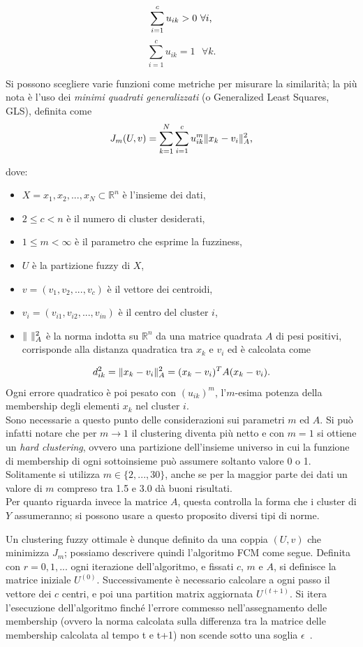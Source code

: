 \documentclass[oneside, openany]{book}
\DeclarePairedDelimiter{\norma}{\lVert}{\rVert}
\begin{document}
		\[
		\sum_{i=1}^{c}u_{ik} > 0\text{ } \forall i\text{,}\\
		\]
		\[
		\sum_{i=1}^{c}u_{ik} = 1 \text{ }\forall k\text{.}
		\]
		
		Si possono scegliere varie funzioni come metriche per misurare la similarità; la più nota è l'uso dei \textit{minimi quadrati generalizzati} (o Generalized Least Squares, GLS), definita come
		\[
			J_m(U, v)=\sum_{k=1}^{N}\sum_{i=1}^{c}u_{ik}^m\norma{x_k-v_i}^2_A\text{,}
		\]
		
		dove:
		\begin{itemize}
			\item $X = {x_1, x_2, ..., x_N} \subset \mathbb{R}^n$ è l'insieme dei dati, 
			\item $2 \leq c < n$ è il numero di cluster desiderati,
			\item $1 \leq m <\infty$ è il parametro che esprime la fuzziness,
			\item $U$ è la partizione fuzzy di $X$,
			\item $v = (v_1, v_2, ..., v_c)$ è il vettore dei centroidi,
			\item $v_i = (v_{i1}, v_{i2}, ..., v_{in})$ è il centro del cluster $i$,
			\item $\norma{\textit{ }}^2_A$ è la norma indotta su $\mathbb{R}^n$ da una matrice quadrata $A$ di pesi positivi, corrisponde alla distanza quadratica tra $x_k$ e $v_i$ ed è calcolata come
		\end{itemize}
		\[
			d^2_{ik} = \norma{x_k-v_i}^2_A = (x_k-v_i)^TA(x_k-v_i)\text{.}
		\] 	
		Ogni errore quadratico è poi pesato con $(u_{ik})^m$, l'$m$-esima potenza della membership degli elementi $x_k$ nel cluster $i$.\\
		Sono necessarie a questo punto delle considerazioni sui parametri $m$ ed $A$. Si può infatti notare che per $m\rightarrow 1$ il clustering diventa più netto e con $m=1$ si ottiene un \textit{hard clustering}, ovvero una partizione dell'insieme universo in cui la funzione di membership di ogni sottoinsieme può assumere soltanto valore 0 o 1. Solitamente si utilizza $m \in\{2,...,30\}$, anche se per la maggior parte dei dati un valore di $m$ compreso tra 1.5 e 3.0 dà buoni risultati. \\
		Per quanto riguarda invece la matrice $A$, questa controlla la forma che i cluster di $Y$ assumeranno; si possono usare a questo proposito diversi tipi di norme.
		
		Un clustering fuzzy ottimale è dunque definito da una coppia $(U, v)$ che minimizza $J_m$; possiamo descrivere quindi l'algoritmo FCM come segue.
		Definita con $r=0,1, ...$ ogni iterazione dell'algoritmo, e fissati $c$, $m$ e $A$, si definisce la matrice iniziale $U^{(0)}$. Successivamente è necessario calcolare a ogni passo il vettore dei $c$ centri, e poi una partition matrix aggiornata $U^{(t+1)}$. Si itera l'esecuzione dell'algoritmo finché l'errore commesso nell'assegnamento delle membership (ovvero la norma calcolata sulla differenza tra la matrice delle membership calcolata al tempo t e t+1) non scende sotto una soglia $\epsilon$~\cite{bib:fcm}.
		
\end{document}
